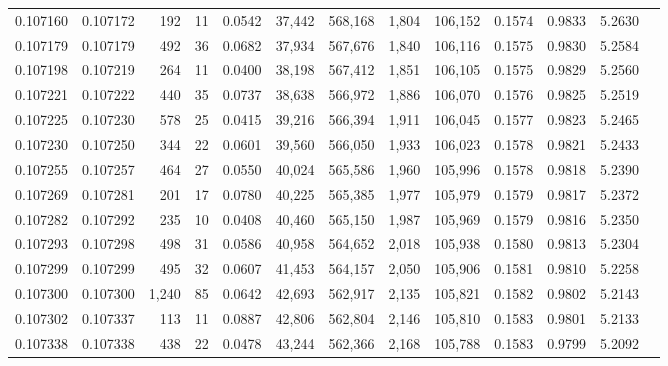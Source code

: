 \begin{tabular}{rrrrrrrrrrrrr}
0.107160 & 0.107172 &   192 &  11 &                                     0.0542 &  37,442 & 568,168 &   1,804 & 106,152 & 0.1574 & 0.9833 & 5.2630 \\
0.107179 & 0.107179 &   492 &  36 &                                     0.0682 &  37,934 & 567,676 &   1,840 & 106,116 & 0.1575 & 0.9830 & 5.2584 \\
0.107198 & 0.107219 &   264 &  11 &                                     0.0400 &  38,198 & 567,412 &   1,851 & 106,105 & 0.1575 & 0.9829 & 5.2560 \\
0.107221 & 0.107222 &   440 &  35 &                                     0.0737 &  38,638 & 566,972 &   1,886 & 106,070 & 0.1576 & 0.9825 & 5.2519 \\
0.107225 & 0.107230 &   578 &  25 &                                     0.0415 &  39,216 & 566,394 &   1,911 & 106,045 & 0.1577 & 0.9823 & 5.2465 \\
0.107230 & 0.107250 &   344 &  22 &                                     0.0601 &  39,560 & 566,050 &   1,933 & 106,023 & 0.1578 & 0.9821 & 5.2433 \\
0.107255 & 0.107257 &   464 &  27 &                                     0.0550 &  40,024 & 565,586 &   1,960 & 105,996 & 0.1578 & 0.9818 & 5.2390 \\
0.107269 & 0.107281 &   201 &  17 &                                     0.0780 &  40,225 & 565,385 &   1,977 & 105,979 & 0.1579 & 0.9817 & 5.2372 \\
0.107282 & 0.107292 &   235 &  10 &                                     0.0408 &  40,460 & 565,150 &   1,987 & 105,969 & 0.1579 & 0.9816 & 5.2350 \\
0.107293 & 0.107298 &   498 &  31 &                                     0.0586 &  40,958 & 564,652 &   2,018 & 105,938 & 0.1580 & 0.9813 & 5.2304 \\
0.107299 & 0.107299 &   495 &  32 &                                     0.0607 &  41,453 & 564,157 &   2,050 & 105,906 & 0.1581 & 0.9810 & 5.2258 \\
0.107300 & 0.107300 & 1,240 &  85 &                                     0.0642 &  42,693 & 562,917 &   2,135 & 105,821 & 0.1582 & 0.9802 & 5.2143 \\
0.107302 & 0.107337 &   113 &  11 &                                     0.0887 &  42,806 & 562,804 &   2,146 & 105,810 & 0.1583 & 0.9801 & 5.2133 \\
0.107338 & 0.107338 &   438 &  22 &                                     0.0478 &  43,244 & 562,366 &   2,168 & 105,788 & 0.1583 & 0.9799 & 5.2092 \\

\end{tabular}
